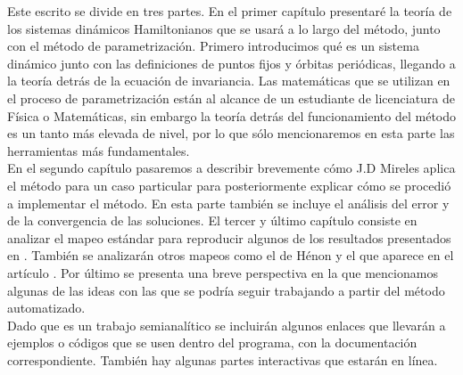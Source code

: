 Este escrito se divide en tres partes. En el primer capítulo presentaré la teoría de los sistemas dinámicos Hamiltonianos que se usará a lo largo del método, junto con el método de parametrización. Primero introducimos qué es un sistema dinámico junto con las definiciones de puntos fijos y órbitas periódicas, llegando a la teoría detrás de la ecuación de invariancia. Las matemáticas que se utilizan en el proceso de parametrización están al alcance de un estudiante de licenciatura de Física o Matemáticas, sin embargo la teoría detrás del funcionamiento del método es un tanto más elevada de nivel, por lo que sólo mencionaremos en esta parte las herramientas más fundamentales.  \\


En el segundo capítulo pasaremos a describir brevemente cómo J.D Mireles aplica el método para un caso particular para posteriormente explicar cómo se procedió a implementar el método. En esta parte también se incluye el análisis del error y de la convergencia de las soluciones. El tercer y último capítulo consiste en analizar el mapeo estándar para reproducir algunos de los resultados presentados en \cite{Mireles}. También se analizarán otros mapeos como el de Hénon y el que aparece en el artículo \cite{Jung}. Por último se presenta una breve perspectiva en la que mencionamos algunas de las ideas con las que se podría seguir trabajando a partir del método automatizado. \\

Dado que es un trabajo semianalítico se incluirán algunos enlaces que llevarán a ejemplos o códigos que se usen dentro del programa, con la documentación correspondiente. También hay algunas partes interactivas que estarán en línea. 

